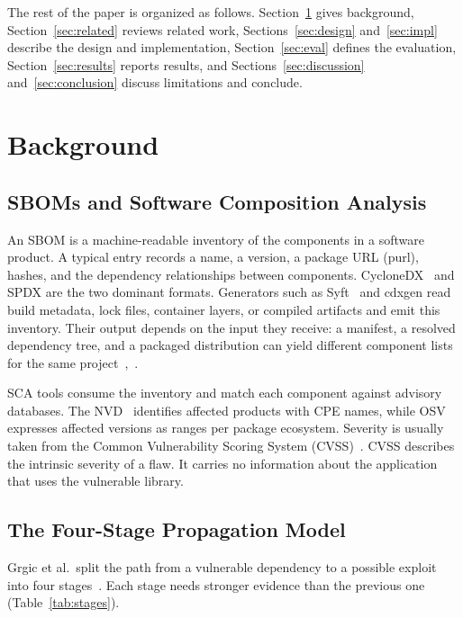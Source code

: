 \documentclass[conference]{IEEEtran}
\begin{document}
The rest of the paper is organized as follows. Section~\ref{sec:background} gives background, Section~\ref{sec:related} reviews related work, Sections~\ref{sec:design} and~\ref{sec:impl} describe the design and implementation, Section~\ref{sec:eval} defines the evaluation, Section~\ref{sec:results} reports results, and Sections~\ref{sec:discussion} and~\ref{sec:conclusion} discuss limitations and conclude.

\section{Background}\label{sec:background}

\subsection{SBOMs and Software Composition Analysis}
An SBOM is a machine-readable inventory of the components in a software product. A typical entry records a name, a version, a package URL (purl), hashes, and the dependency relationships between components. CycloneDX~\cite{cyclonedx} and SPDX are the two dominant formats. Generators such as Syft~\cite{syft} and cdxgen read build metadata, lock files, container layers, or compiled artifacts and emit this inventory. Their output depends on the input they receive: a manifest, a resolved dependency tree, and a packaged distribution can yield different component lists for the same project~\cite{grgic},~\cite{balliu}.

SCA tools consume the inventory and match each component against advisory databases. The NVD~\cite{nvd} identifies affected products with CPE names, while OSV~\cite{osv} expresses affected versions as ranges per package ecosystem. Severity is usually taken from the Common Vulnerability Scoring System (CVSS)~\cite{cvss}. CVSS describes the intrinsic severity of a flaw. It carries no information about the application that uses the vulnerable library.

\subsection{The Four-Stage Propagation Model}
Grgic et al.\ split the path from a vulnerable dependency to a possible exploit into four stages~\cite{grgic}. Each stage needs stronger evidence than the previous one (Table~\ref{tab:stages}).
\end{document}
